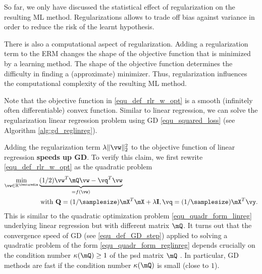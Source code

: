 \documentclass[12pt]{report}
\begin{document}

So far, we only have discussed the statistical effect of regularization on the 
resulting ML method. Regularizations allows to trade off bias against variance 
in order to reduce the risk of the learnt hypothesis. 

There is also a computational aspect of regularization. Adding a regularization 
term to the ERM changes the shape of the objective function that is minimized 
by a learning method. The shape of the objective function determines the difficulty 
in finding a (approximate) minimizer. Thus, regularization influences the computational
complexity of the resulting ML method.  

Note that the objective function in \eqref{equ_def_rlr_w_opt} is a smooth (infinitely often differentiable) 
convex function. Similar to linear regression, we can solve the regularization 
linear regression problem using GD \eqref{equ_squared_loss} 
(see Algorithm \ref{alg:gd_reglinreg}). 

Adding the regularization term $\lambda \| \vw \|^{2}_{2}$ to the objective 
function of linear regression {\bf speeds up GD}. To verify this claim, we first 
rewrite \eqref{equ_def_rlr_w_opt} as the quadratic problem 
\begin{align} 
\label{equ_quadr_form_reglinreg}
\min_{\vw \in \mathbb{R}^{\featuredim}} & \underbrace{(1/2) \vw^{T} \mQ \vw - \vq^{T}  \vw}_{= f(\vw)} \nonumber \\ 
 & \mbox{ with } \mathbf{Q}= (1/\samplesize) \mX^{T} \mX + \lambda \mathbf{I}, \vq =(1/\samplesize) \mX^{T} \vy. %
\end{align} 
This is similar to the quadratic optimization problem \eqref{equ_quadr_form_linreg} 
underlying linear regression but with different matrix $\mQ$. It turns out 
that the convergence speed of GD (see \eqref{equ_def_GD_step}) applied 
to solving a quadratic problem of the form \eqref{equ_quadr_form_reglinreg} 
depends crucially on the condition number $\kappa(\mQ) \geq 1$ of the 
psd matrix $\mQ$ \cite{JungFixedPoint}. In particular, GD methods are fast 
if the condition number $\kappa(\mQ)$ is small (close to $1$). 
\end{document}
